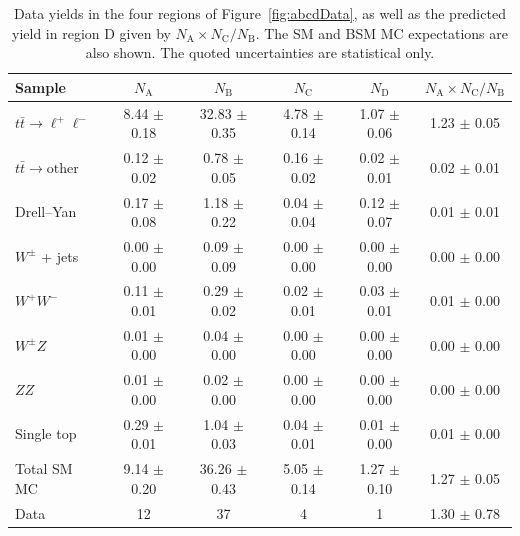 \begin{table}[hbt]
\begin{center}
\caption{\label{tab:datayield} Data yields in the four
regions of Figure~\ref{fig:abcdData}, as well as the predicted yield in region D given
by $N_\textrm{A}\times{}N_\textrm{C}/N_\textrm{B}$. The SM and BSM MC expectations are also shown.  
The quoted uncertainties are statistical only.}
\vspace{2 mm}
\begin{tabular}{l||c|c|c|c||c}
\hline
              Sample                    &        $N_\text{A}$  &         $N_\text{B}$  &         $N_\text{C}$  &          $N_\text{D}$ &$N_\textrm{A}\times{}N_\textrm{C}/N_\textrm{B}$\\
\hline
$t\bar{t}\rightarrow \ell^{+}\ell^{-}$  &  8.44  $\pm$  0.18   &  32.83  $\pm$  0.35   &   4.78  $\pm$  0.14   &   1.07  $\pm$  0.06   &   1.23  $\pm$  0.05  \\
$t\bar{t}\rightarrow \mathrm{other}$    &  0.12  $\pm$  0.02   &   0.78  $\pm$  0.05   &   0.16  $\pm$  0.02   &   0.02  $\pm$  0.01   &   0.02  $\pm$  0.01  \\
Drell--Yan                               &  0.17  $\pm$  0.08   &   1.18  $\pm$  0.22   &   0.04  $\pm$  0.04   &   0.12  $\pm$  0.07   &   0.01  $\pm$  0.01  \\
    $W^{\pm}$ + jets                    &  0.00  $\pm$  0.00   &   0.09  $\pm$  0.09   &   0.00  $\pm$  0.00   &   0.00  $\pm$  0.00   &   0.00  $\pm$  0.00  \\
            $W^+W^-$                    &  0.11  $\pm$  0.01   &   0.29  $\pm$  0.02   &   0.02  $\pm$  0.01   &   0.03  $\pm$  0.01   &   0.01  $\pm$  0.00  \\
        $W^{\pm}Z$                      &  0.01  $\pm$  0.00   &   0.04  $\pm$  0.00   &   0.00  $\pm$  0.00   &   0.00  $\pm$  0.00   &   0.00  $\pm$  0.00  \\
            $ZZ$                        &  0.01  $\pm$  0.00   &   0.02  $\pm$  0.00   &   0.00  $\pm$  0.00   &   0.00  $\pm$  0.00   &   0.00  $\pm$  0.00  \\
          Single top                    &  0.29  $\pm$  0.01   &   1.04  $\pm$  0.03   &   0.04  $\pm$  0.01   &   0.01  $\pm$  0.00   &   0.01  $\pm$  0.00  \\
\hline
         Total SM MC                    &  9.14  $\pm$  0.20   &  36.26  $\pm$  0.43   &   5.05  $\pm$  0.14   &   1.27  $\pm$  0.10   &   1.27  $\pm$  0.05  \\
\hline
                Data                    &                 12   &                  37   &                   4   &                   1   &   1.30  $\pm$  0.78  \\

\end{tabular}
\end{center}
\end{table}
